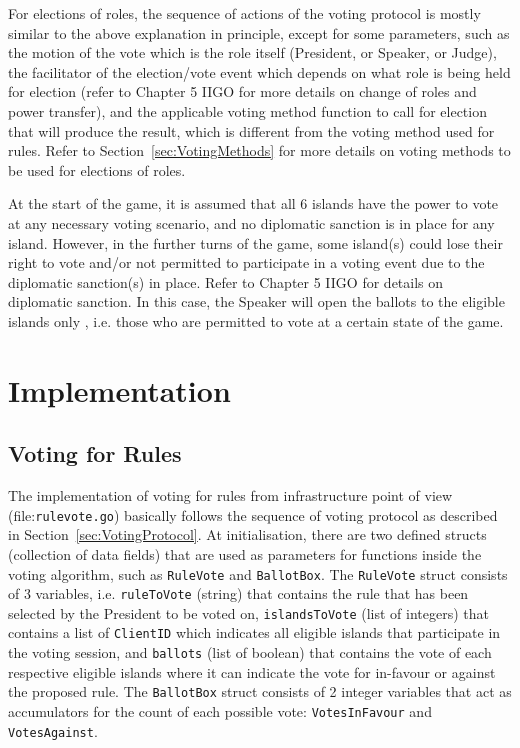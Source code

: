 For elections of roles, the sequence of actions of the voting protocol is mostly similar to the above explanation in principle, except for some parameters, such as the motion of the vote which is the role itself (President, or Speaker, or Judge), the facilitator of the election/vote event which depends on what role is being held for election (refer to Chapter 5 IIGO for more details on change of roles and power transfer), and the applicable voting method function to call for election that will produce the result, which is different from the voting method used for rules. Refer to Section~\ref{sec:VotingMethods} for more details on voting methods to be used for elections of roles.

At the start of the game, it is assumed that all 6 islands have the power to vote at any necessary voting scenario, and no diplomatic sanction is in place for any island. However, in the further turns of the game, some island(s) could lose their right to vote and/or not permitted to participate in a voting event due to the diplomatic sanction(s) in place. Refer to Chapter 5 IIGO for details on diplomatic sanction. In this case, the Speaker will open the ballots to the eligible islands only , i.e. those who are permitted to vote at a certain state of the game.


\section{Implementation}
\label{sec:Implementation}

\subsection{Voting for Rules}
\label{sec:VotingForRules}
The implementation of voting for rules from infrastructure point of view (file:\texttt{rulevote.go}) basically follows the sequence of voting protocol as described in Section~\ref{sec:VotingProtocol}. At initialisation, there are two defined structs (collection of data fields) that are used as parameters for functions inside the voting algorithm, such as \texttt{RuleVote} and \texttt{BallotBox}. The \texttt{RuleVote} struct consists of 3 variables, i.e. \texttt{ruleToVote} (string) that contains the rule that has been selected by the President to be voted on, \texttt{islandsToVote} (list of integers) that contains a list of \texttt{ClientID} which indicates all eligible islands that participate in the voting session, and \texttt{ballots} (list of boolean) that contains the vote of each respective eligible islands where it can indicate the vote for in-favour or against the proposed rule. The \texttt{BallotBox} struct consists of 2 integer variables that act as accumulators for the count of each possible vote: \texttt{VotesInFavour} and \texttt{VotesAgainst}.

